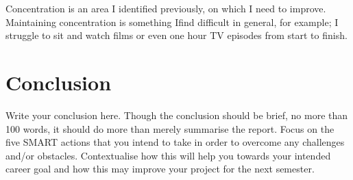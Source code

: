 \documentclass{scrartcl}
\begin{document}
Concentration is an area I identified previously, on which I need to improve. Maintaining concentration is something Ifind difficult in general, for example; I struggle to sit and watch films or even one hour TV episodes from start to finish. 


\section{Conclusion}

Write your conclusion here. Though the conclusion should be brief, no more than 100 words, it should do more than merely summarise the report. Focus on the five SMART actions that you intend to take in order to overcome any challenges and/or obstacles. Contextualise how this will help you towards your intended career goal and how this may improve your project for the next semester.



\end{document}
